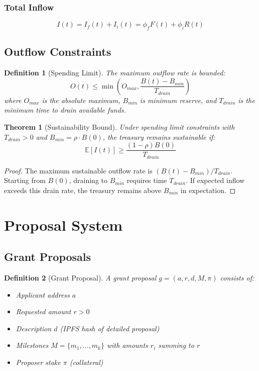 \documentclass[11pt,a4paper]{article}
\newtheorem{definition}{Definition}
\newtheorem{theorem}{Theorem}
\begin{document}
\subsubsection{Total Inflow}

\[
I(t) = I_f(t) + I_i(t) = \phi_f F(t) + \phi_i R(t)
\]

\subsection{Outflow Constraints}

\begin{definition}[Spending Limit]
The maximum outflow rate is bounded:
\[
O(t) \leq \min\left( O_{max}, \frac{B(t) - B_{min}}{T_{drain}} \right)
\]
where $O_{max}$ is the absolute maximum, $B_{min}$ is minimum reserve, and $T_{drain}$ is the minimum time to drain available funds.
\end{definition}

\begin{theorem}[Sustainability Bound]
Under spending limit constraints with $T_{drain} > 0$ and $B_{min} = \rho \cdot B(0)$, the treasury remains sustainable if:
\[
\mathbb{E}[I(t)] \geq \frac{(1-\rho) B(0)}{T_{drain}}
\]
\end{theorem}

\begin{proof}
The maximum sustainable outflow rate is $(B(t) - B_{min})/T_{drain}$. Starting from $B(0)$, draining to $B_{min}$ requires time $T_{drain}$. If expected inflow exceeds this drain rate, the treasury remains above $B_{min}$ in expectation.
\end{proof}

\section{Proposal System}

\subsection{Grant Proposals}

\begin{definition}[Grant Proposal]
A grant proposal $g = (a, r, d, M, \pi)$ consists of:
\begin{itemize}
    \item Applicant address $a$
    \item Requested amount $r > 0$
    \item Description $d$ (IPFS hash of detailed proposal)
    \item Milestones $M = \{m_1, \ldots, m_k\}$ with amounts $r_i$ summing to $r$
    \item Proposer stake $\pi$ (collateral)
\end{itemize}
\end{definition}
\end{document}
